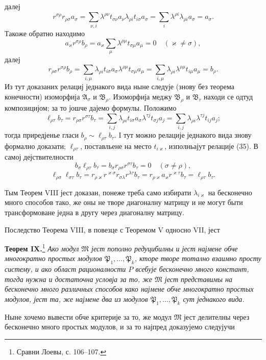 ﻿\documentclass[11pt]{article}
\begin{document}
далеј
\[
 r^{\sigma\rho}r_{\rho\sigma}a_\sigma
 =\sum_{\nu,i}\lambda^{\rho\nu}t_{\sigma\nu}a_\nu\lambda_{\rho i}t_{i\sigma}a_\sigma
 =\sum_i\lambda^{\rho i}\lambda_{\rho i}a_\sigma=a_\sigma.
\]
Такоже обратно находимо
\[
 a_\varkappa r^{\sigma\rho}b_\rho
 =a_\varkappa\sum_\mu\lambda^{\rho\mu}t_{\sigma\mu}a_\mu=0
 \quad(\varkappa\ne\sigma),
\]
далеј
\[
 r_{\rho\sigma}r^{\sigma\rho}b_\rho
 =\sum_{i,\mu}\lambda_{\rho i}t_{i\sigma}a_\sigma\lambda^{\rho\mu}t_{\sigma\mu}a_\mu
 =\sum_{i,\mu}\lambda_{\rho i}\lambda^{\rho\mu}t_{i\mu}a_\mu=b_\rho.
\]
Из тут доказаних релациј једнакого вида ныне следује (знову без теорема конечности) изоморфија \(\mathfrak A_\sigma\) и \(\mathfrak B_\rho\). Изоморфија меджу \(\mathfrak B_\rho\) и \(\mathfrak B_\tau\) находи се одтуд композицијом; за то јошче дајемо формулы. Положимо
\[
 \ell_{\rho\tau}b_\tau=r_{\rho\sigma}r^{\sigma\tau}b_\tau
 =\sum_{i,j}\lambda_{\rho i}t_{i\sigma}a_\sigma\lambda^{\tau j}t_{\sigma j}a_j
 =\sum_{i,j}\lambda_{\rho i}\lambda^{\tau j}t_{ij}a_j;
\]
тогда приредјенье гласи \(b_\rho\sim\ell_{\rho\tau}b_\tau\). I тут можно релације једнакого вида знову формално доказати; \(\ell_{\rho\tau}\), поставльене на место \(t_{i\varkappa}\), изполньајут релације (35). В самој дејствителности
\[
 b_\sigma\ell_{\rho\tau}b_\tau=b_\sigma r_{\rho\sigma}r^{\sigma\tau}b_\tau=0\quad(\sigma\ne\rho),
\]
\[
 \ell_{\rho\sigma}\ell_{\sigma\tau}b_\tau=r_{\rho\varkappa}r^{\varkappa\sigma}r_{\sigma\lambda}r^{\lambda\tau}b_\tau
 =r_{\rho\varkappa}a_\varkappa r^{\varkappa\tau}b_\tau=\ell_{\rho\tau}b_\tau.
\]

Тым Теорем VIII јест доказан, понеже треба само избирати \(\lambda_{i\varkappa}\) на бесконечно много способов тако, же оны не творе диагоналну матрицу и не могут быти трансформоване једна в другу через диагоналну матрицу.

Последство Теорема VIII, в повезце с Теоремом V односно VII, јест

\textbf{Теорем IX.}\footnote{Сравни Лоевы, с. 106--107.} \textit{Ако модул \(\mathfrak M\) јест пополно редуцибилны и јест најмене обче многократно простых модулов \(\mathfrak P_1,
\ldots,
\mathfrak P_k\), кторе творе тотално взаимно просту систему, и ако област рационалности \(P\) всебује бесконечно много констант, тогда нужна и достаточна условја за то, же \(\mathfrak M\) јест представимы на бесконечно много различных способов како најмене обче многократно простых модулов, јест та, же најмене два из модулов \(\mathfrak P_1,
\ldots,
\mathfrak P_k\) сут једнакого вида.}

Ныне хочемо вывести обче критерије за то, же модул \(\mathfrak M\) јест делителны через бесконечно много простых модулов, и за то најпред доказујемо следујучи
\end{document}
